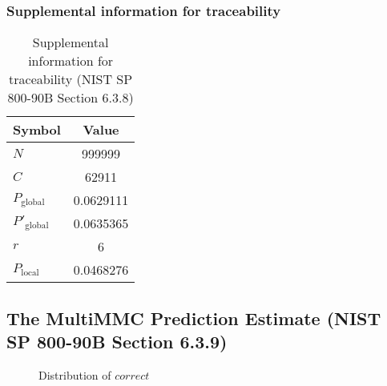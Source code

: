 \documentclass[a3paper,xelatex,english]{bxjsarticle}
\begin{document}
\subsubsection{Supplemental information for traceability}
\renewcommand{\arraystretch}{1.8}
\begin{table}[h]
\caption{Supplemental information for traceability (NIST SP 800-90B Section 6.3.8)}
\begin{center}
\begin{tabular}{|l|c|}
\hline 
\rowcolor{anotherlightblue} %
Symbol				& Value \\ \hline 
$N$				& 999999\\ \hline 
$C$				& 62911\\ \hline 
$P_{\textrm{global}}$				& 0.0629111\\ \hline 
$P'_{\textrm{global}}$			& 0.0635365\\ \hline 
$r$				& 6\\ \hline 
$P_{\textrm{local}}$ 			& 0.0468276\\ \hline
\end{tabular}
\end{center}
\end{table}
\renewcommand{\arraystretch}{1.4}
\clearpage
\subsection{The MultiMMC Prediction Estimate (NIST SP 800-90B Section 6.3.9)}
\begin{figure}[htbp]
\caption{Distribution of $correct$}
\end{figure}
\end{document}
